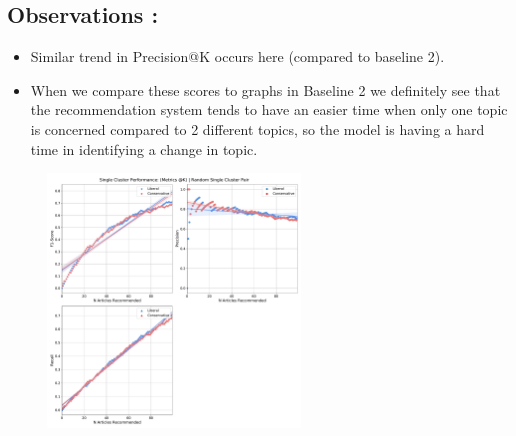\documentclass[a4paper,fontsize=9.0pt]{scrartcl}
\begin{document}
\subsection{Observations :}
\begin{flushleft}
\begin{itemize}
    \item Similar trend in Precision@K occurs here (compared to baseline 2). 
    \item  When we compare these scores to graphs in Baseline 2 we definitely see that the recommendation system tends to have an easier time when only one topic is concerned compared to 2 different topics, so the model is having a hard time in identifying a change in topic.
\end{itemize}
\end{flushleft}
\begin{figure}[H]
 \includegraphics[width=0.6\textwidth]{Graphs/user_interaction_vs_model_performance_single_cluster.pdf}
\end{figure}



\vspace{-1ex}
\end{document}
